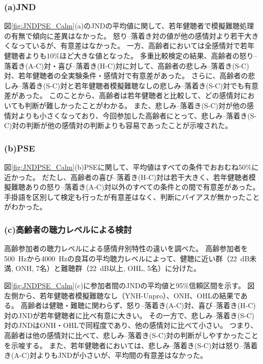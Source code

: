 \subsubsection{(a)JND}
図\ref{fig:JNDPSE_Calm}(a)のJNDの平均値に関して、若年健聴者で模擬難聴処理の有無で傾向に差異はなかった。
怒り--落着き対の値が他の感情対より若干大きくなっているが、有意差はなかった。
一方、高齢者においては全感情対で若年健聴者よりも10\%ほど大きな値となった。
多重比較検定の結果、高齢者の怒り--落着き(A-C)対・喜び--落着き(H-C)対に対して、高齢者の悲しみ--落着き(S-C)対、若年健聴者の全実験条件・感情対で有意差があった。
さらに、高齢者の悲しみ--落着き(S-C)対と若年健聴者模擬難聴なしの悲しみ--落着き(S-C)対でも有意差があった。 
このことから、高齢者は若年健聴者と比較して、どの感情対においても判断が難しかったことがわかる。
また、悲しみ--落着き(S-C)対が他の感情対よりも小さくなっており、今回参加した高齢者にとって、悲しみ--落着き(S-C)対の判断が他の感情対の判断よりも容易であったことが示唆された。


\subsubsection{(b)PSE}
図\ref{fig:JNDPSE_Calm}(b)PSEに関して、平均値はすべての条件でおおむね50\%に近かった。
だたし、高齢者の喜び--落着き(H-C)対は若干大きく、若年健聴者模擬難聴ありの怒り--落着き(A-C)対以外のすべての条件との間で有意差があった。
手掛語を区別して検定も行ったが有意差はなく、判断にバイアスが無かったことがわかった。


\subsubsection{(c)高齢者の聴力レベルによる検討}
高齢参加者の聴力レベルによる感情弁別特性の違いを調べた。
高齢参加者を500~Hzから4000~Hzの良耳の平均聴力レベルによって、健聴に近い群（22~dB未満, ONH, 7名）と難聴群（22~dB以上, OHL, 5名）に分けた。

図\ref{fig:JNDPSE_Calm}(c)に参加者間のJNDの平均値と95\%信頼区間を示す。
図左側から、若年健聴者模擬難聴なし（YNH-Unpro）、ONH、OHLの結果である。
高齢者は健聴・難聴に関わらず、怒り--落着き(A-C)対、喜び--落着き(H-C)対のJNDが若年健聴者に比べ有意に大きい。
その一方で、悲しみ--落着き(S-C)対のJNDはONH・OHLで同程度であり、他の感情対に比べて小さい。
つまり、高齢者は他の感情対に比べて、悲しみ--落着き(S-C)対の判断がしやすかったことを示唆する。
また、若年健聴者においては、悲しみ--落着き(S-C)対は怒り--落着き(A-C)対よりもJNDが小さいが、平均間の有意差はなかった。

